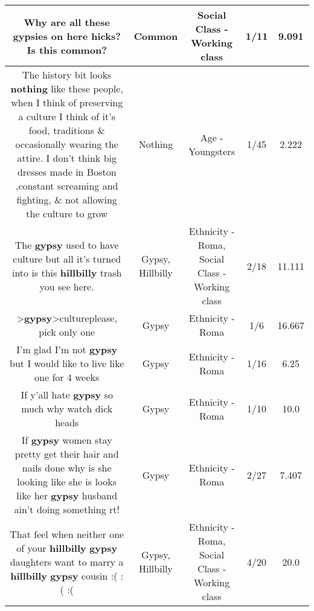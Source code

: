 \documentclass[11pt]{article}
\newlength\mylength
\begin{document}
\begin{center}
\begin{longtable}{|C{.65\mylength}|C{.30\mylength}|C{.12\mylength}|C{.12\mylength}|C{.12\mylength}|}
  \small Why are all these gypsies on here hicks? Is this \textbf{common}?\normalsize   & Common & Social Class - Working class & 1/11 & 9.091 \\  \hline
  \small The history bit looks \textbf{nothing} like these people, when I think of preserving a culture I think of it's food, traditions \& occasionally wearing the attire. I don't think big dresses made in Boston ,constant screaming and fighting, \& not allowing the culture to grow\normalsize   & Nothing & Age - Youngsters & 1/45 & 2.222 \\  \hline
  \small The \textbf{gypsy} used to have culture but all it's turned into is this \textbf{hillbilly} trash you see here.\normalsize   & Gypsy, Hillbilly & Ethnicity - Roma, Social Class - Working class & 2/18 & 11.111 \\  \hline
  \small >\textbf{gypsy}>cultureplease, pick only one\normalsize   & Gypsy & Ethnicity - Roma & 1/6 & 16.667 \\  \hline
  \small I'm glad I'm not \textbf{gypsy} but I would like to live like one for 4 weeks\normalsize   & Gypsy & Ethnicity - Roma & 1/16 & 6.25 \\  \hline
  \small If y'all hate \textbf{gypsy} so much why watch dick heads\normalsize   & Gypsy & Ethnicity - Roma & 1/10 & 10.0 \\  \hline
  \small If \textbf{gypsy} women stay pretty get their hair and nails done why is she looking like she is looks like her \textbf{gypsy} husband ain't doing something rt!\normalsize   & Gypsy & Ethnicity - Roma & 2/27 & 7.407 \\  \hline
  \small That feel when neither one of your \textbf{hillbilly} \textbf{gypsy} daughters want to marry a \textbf{hillbilly} \textbf{gypsy} cousin :( :( :(\normalsize   & Gypsy, Hillbilly & Ethnicity - Roma, Social Class - Working class & 4/20 & 20.0 \\  \hline

\end{longtable}
\end{center}
\end{document}

